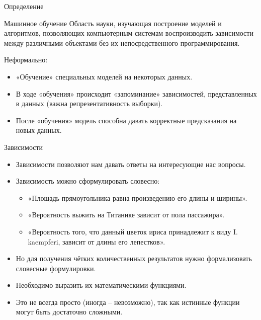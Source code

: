 \documentclass[c, handout]{beamer} %
\begin{document}
	\begin{frame}{Определение}
		\begin{block}{Машинное обучение}
			Область науки, изучающая построение моделей и алгоритмов, позволяющих компьютерным системам воспроизводить \alert{зависимости} между различными объектами \alert{без} их непосредственного \alert{программирования}. 
		\end{block}\vspace{1em}
	
	Неформально:
		\begin{itemize}
			\item «Обучение» специальных моделей на некоторых данных.
			\item  В ходе «обучения» происходит «запоминание» зависимостей, представленных в данных (важна репрезентативность выборки). 
			\item После «обучения» модель способна давать корректные предсказания на новых данных.
		\end{itemize}
	
	\end{frame}

	\begin{frame}{Зависимости}
		\begin{itemize}\setlength\itemsep{1em}
			\item<1-> Зависимости позволяют нам давать ответы на интересующие нас вопросы.
			\item<1-> Зависимость можно сформулировать словесно:
				\begin{itemize}\setlength\itemsep{0.4em}
					\item «Площадь прямоугольника равна произведению его длины и ширины». 
					\item «Вероятность выжить на Титанике зависит от пола пассажира».
					\item «Вероятность того, что данный цветок ириса принадлежит к виду I. kaempferi, зависит от длины его лепестков».
				\end{itemize}
			\item<2-> Но для получения чётких количественных результатов нужно формализовать словесные формулировки.
			\item<2-> Необходимо выразить их математическими функциями. 
			\item<2-> Это не всегда просто (иногда – невозможно), так как истинные функции могут быть достаточно сложными. 
		\end{itemize}
		
	\end{frame}
\end{document}
